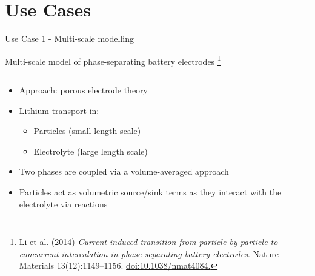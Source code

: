 \documentclass[compress,newPxFont,sthlmFooter]{beamer}
\begin{document}
\section{Use Cases} 

\begin{frame}[plain]{Use Case 1 - Multi-scale modelling}
    \begin{center}
        \alert{Multi-scale model of phase-separating battery electrodes}
        \footnote{\tiny{Li et al. (2014) \textit{Current-induced transition
                    from particle-by-particle to concurrent intercalation in phase-separating battery electrodes}.
                    Nature Materials 13(12):1149–1156. \href{https://doi.org/10.1038/nmat4084}{doi:10.1038/nmat4084.}}
                }
    \end{center}  
    \begin{columns}[c]
      \begin{column}{0.6\textwidth}
        {\small
         \begin{itemize}
            \item Approach: \alert{porous electrode theory}
            \item Lithium transport in:
            \begin{itemize}
                \item Particles (small length scale)
                \item Electrolyte (large length scale)
            \end{itemize}
            \item Two phases are coupled via a volume-averaged approach
            \item Particles act as volumetric source/sink terms as they interact with the
                  electrolyte via reactions
        \end{itemize}
        }
      \end{column}
      

\end{columns}
\end{frame}
\end{document}
